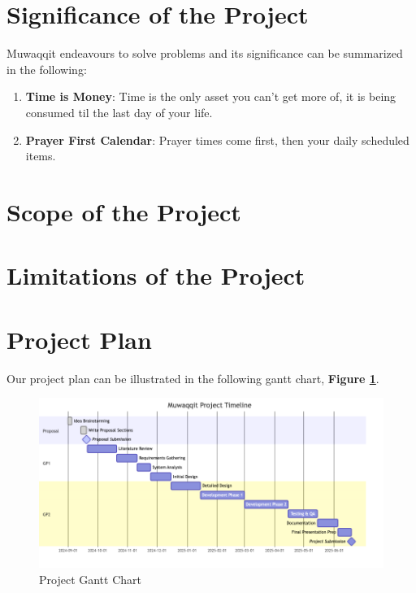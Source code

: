 \documentclass[12pt,a4paper]{article}
\begin{document}
\section{Significance of the Project}

Muwaqqit endeavours to solve problems and its significance can be summarized in the following:

\begin{enumerate}
    \item \textbf{Time is Money}: Time is the only asset you can't get more of, it is being consumed til the last day of your life.
    \item \textbf{Prayer First Calendar}: Prayer times come first, then your daily scheduled items.
\end{enumerate}

\section{Scope of the Project}


\section{Limitations of the Project}


\section{Project Plan}

Our project plan can be illustrated in the following gantt chart, \textbf{Figure \ref{fig:project-gantt-chart}}.

\begin{figure}[!h]
    \centering
    \includegraphics[width=\textwidth]{images/gantt.png}
    \caption{Project Gantt Chart}
    \label{fig:project-gantt-chart}
\end{figure}
\end{document}
